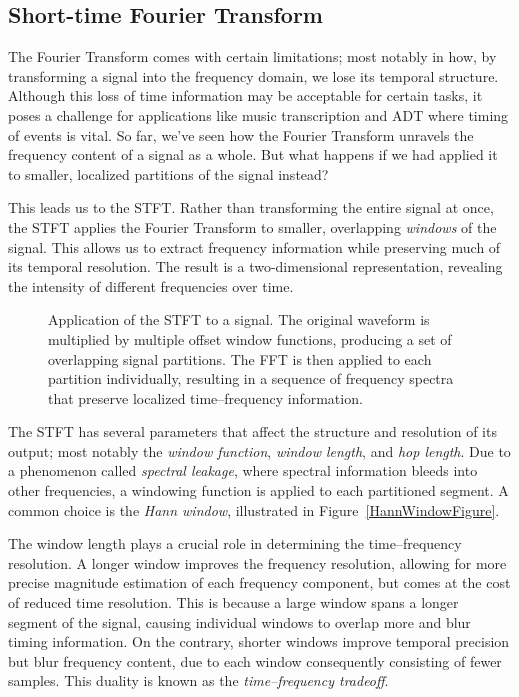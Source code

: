 \subsection{Short-time Fourier Transform}

The Fourier Transform comes with certain limitations; most notably in how, by transforming a signal into the frequency domain, we lose its temporal structure. Although this loss of time information may be acceptable for certain tasks, it poses a challenge for applications like music transcription and \gls{ADT} where timing of events is vital. So far, we've seen how the Fourier Transform unravels the frequency content of a signal as a whole. But what happens if we had applied it to smaller, localized partitions of the signal instead?

This leads us to the \gls{STFT}. Rather than transforming the entire signal at once, the \gls{STFT} applies the Fourier Transform to smaller, overlapping \textit{windows} of the signal. This allows us to extract frequency information while preserving much of its temporal resolution. The result is a two-dimensional representation, revealing the intensity of different frequencies over time.

\begin{figure}[H]
    \centering
    
    \caption{Application of the \gls{STFT} to a signal. The original waveform is multiplied by multiple offset window functions, producing a set of overlapping signal partitions. The \gls{FFT} is then applied to each partition individually, resulting in a sequence of frequency spectra that preserve localized time–frequency information.}
    \label{STFTFigure}
\end{figure}

The \gls{STFT} has several parameters that affect the structure and resolution of its output; most notably the \textit{window function}, \textit{window length}, and \textit{hop length}. Due to a phenomenon called \textit{spectral leakage}, where spectral information bleeds into other frequencies, a windowing function is applied to each partitioned segment. A common choice is the \textit{Hann window}, illustrated in Figure~\ref{HannWindowFigure}.

The window length plays a crucial role in determining the time–frequency resolution. A longer window improves the frequency resolution, allowing for more precise magnitude estimation of each frequency component, but comes at the cost of reduced time resolution. This is because a large window spans a longer segment of the signal, causing individual windows to overlap more and blur timing information. On the contrary, shorter windows improve temporal precision but blur frequency content, due to each window consequently consisting of fewer samples. This duality is known as the \textit{time–frequency tradeoff}.

